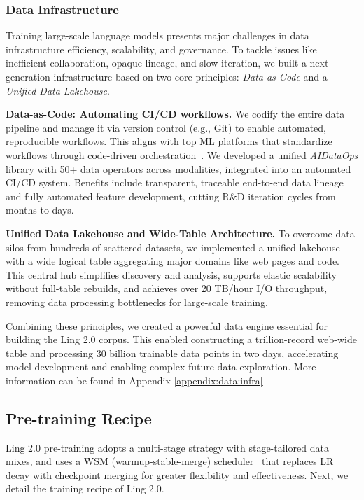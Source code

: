 \documentclass[table]{gtech}
\theoremstyle{definition}
\begin{document}
\subsubsection{Data Infrastructure}
Training large-scale language models presents major challenges in data infrastructure efficiency, scalability, and governance. To tackle issues like inefficient collaboration, opaque lineage, and slow iteration, we built a next-generation infrastructure based on two core principles: \emph{Data-as-Code} and a \emph{Unified Data Lakehouse}.

{\bfseries Data-as-Code: Automating CI/CD workflows.} 
We codify the entire data pipeline and manage it via version control (e.g., Git) to enable automated, reproducible workflows. This aligns with top ML platforms that standardize workflows through code-driven orchestration~\citep{datainfra1}. We developed a unified \emph{AIDataOps} library with 50+ data operators across modalities, integrated into an automated CI/CD system. Benefits include transparent, traceable end-to-end data lineage and fully automated feature development, cutting R\&D iteration cycles from months to days.

{\bfseries Unified Data Lakehouse and Wide-Table Architecture.}  
To overcome data silos from hundreds of scattered datasets, we implemented a unified lakehouse~\citep{datainfra2} with a wide logical table aggregating major domains like web pages and code. This central hub simplifies discovery and analysis, supports elastic scalability without full-table rebuilds, and achieves over 20 TB/hour I/O throughput, removing data processing bottlenecks for large-scale training.

Combining these principles, we created a powerful data engine essential for building the Ling 2.0 corpus. This enabled constructing a trillion-record web-wide table and processing 30 billion trainable data points in two days, accelerating model development and enabling complex future data exploration. More information can be found in Appendix \ref{appendix:data:infra}

\subsection{Pre-training Recipe}
Ling 2.0 pre-training adopts a multi-stage strategy with stage-tailored data mixes, and uses a WSM (warmup-stable-merge) scheduler~\citep{tian2025wsmdecayfreelearningrate} that replaces LR decay with checkpoint merging for greater flexibility and effectiveness. 
Next, we detail the training recipe of Ling 2.0. 
\end{document}
